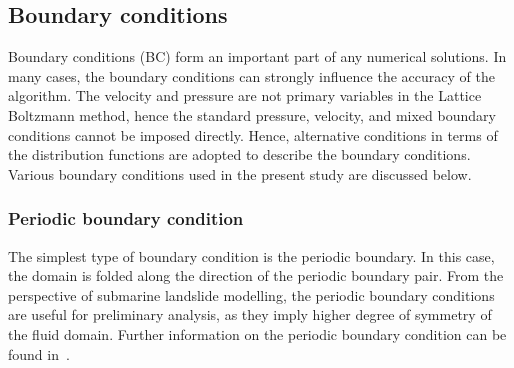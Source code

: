 \subsection{Boundary conditions}
Boundary conditions (BC) form an important part of any numerical solutions. In many cases, the boundary conditions can strongly influence the accuracy of the algorithm. The velocity and pressure are not primary variables in the Lattice Boltzmann method, hence the standard pressure, velocity, and mixed boundary conditions cannot be imposed directly. Hence, alternative conditions in terms of the distribution functions are adopted to describe the boundary conditions. Various boundary conditions used in the present study are discussed below.
\subsubsection*{Periodic boundary condition}
The simplest type of boundary condition is the periodic boundary. In this case, the domain is folded along the direction of the periodic boundary pair. From the perspective of submarine landslide modelling, the periodic boundary conditions are useful for preliminary analysis, as they imply higher degree of symmetry of the fluid domain. Further information on the periodic boundary condition can be found in~\citet{aidun1998}.
